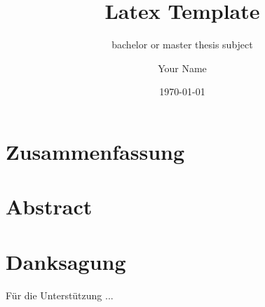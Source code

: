 \documentclass[
	12pt %
	,a4paper %
	,headings=normal %
	,toc=graduated %
]{scrreprt} %
\author{Your Name}
\title{Latex Template}
\subtitle{bachelor or master thesis subject}
\date{\today}
\begin{document}
\renewcommand{\thesection}{\Roman{section}}
\renewcommand{\theHsection}{\Roman{section}}



\maketitle


\section*{Zusammenfassung} %
	\blindtext

\section*{Abstract}
	\blindtext
{}

\newpage


\section*{Danksagung}

Für die Unterstützung ...


\tableofcontents

\newpage
\onehalfspacing %
\renewcommand{\thesection}{\arabic{section}}
\renewcommand{\theHsection}{\arabic{section}}
\setcounter{section}{0}
\setcounter{page}{1}

\end{document}
